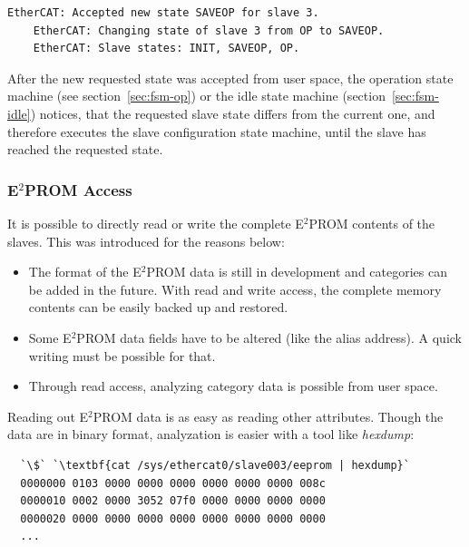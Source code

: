 \documentclass[a4paper,12pt,BCOR6mm,bibtotoc,idxtotoc]{scrbook}
\begin{document}
\begin{description}
  \begin{lstlisting}[gobble=4]
    EtherCAT: Accepted new state SAVEOP for slave 3.
    EtherCAT: Changing state of slave 3 from OP to SAVEOP.
    EtherCAT: Slave states: INIT, SAVEOP, OP.
  \end{lstlisting}

  After the new requested state was accepted from user space, the
  operation state machine (see section~\ref{sec:fsm-op}) or the idle
  state machine (section~\ref{sec:fsm-idle}) notices, that the
  requested slave state differs from the current one, and therefore
  executes the slave configuration state machine, until the slave has
  reached the requested state.
\end{description}


\subsubsection{E$^2$PROM Access}
\label{sec:eepromaccess}

It is possible to directly read or write the complete E$^2$PROM
contents of the slaves. This was introduced for the reasons below:

\begin{itemize}
\item The format of the E$^2$PROM data is still in development and
  categories can be added in the future. With read and write access,
  the complete memory contents can be easily backed up and restored.
\item Some E$^2$PROM data fields have to be altered (like the alias
  address). A quick writing must be possible for that.
\item Through read access, analyzing category data is possible from
  user space.
\end{itemize}

Reading out E$^2$PROM data is as easy as reading other
attributes. Though the data are in binary format, analyzation is
easier with a tool like \textit{hexdump}:

\begin{lstlisting}
  `\$` `\textbf{cat /sys/ethercat0/slave003/eeprom | hexdump}`
  0000000 0103 0000 0000 0000 0000 0000 0000 008c
  0000010 0002 0000 3052 07f0 0000 0000 0000 0000
  0000020 0000 0000 0000 0000 0000 0000 0000 0000
  ...
\end{lstlisting}
\end{document}
